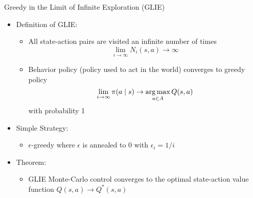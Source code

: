 \begin{frame}[c]{Greedy in the Limit of Infinite Exploration (GLIE)}
	
	\begin{itemize}
		\item Definition of GLIE:
		\begin{itemize}
			\item All state-action pairs are visited an infinite number of times
			$$ \lim_{i\to\infty} N_i(s,a) \to \infty$$
			\item Behavior policy (policy used to act in the world) converges to greedy
			policy
			$$\lim_{i\to \infty} \pi(a\mid s) \to \operatorname*{arg\,max}_{a\in A} Q(s,a)$$ with probability 1
		\end{itemize}
		\medskip
		\pause
		\item Simple Strategy:
		\begin{itemize}
			\item $\epsilon$-greedy where $\epsilon$ is annealed to $0$ with $\epsilon_i = 1 / i$
		\end{itemize}
		\medskip
		\pause
		\item Theorem:
		\begin{itemize}
			\item GLIE Monte-Carlo control converges to the optimal state-action value
			function $Q(s,a) \to Q^*(s,a)$
		\end{itemize}
	\end{itemize}
	
\end{frame}

